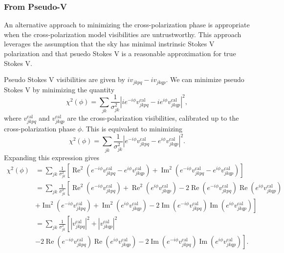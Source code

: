 \documentclass{article}
\newcommand\re{\operatorname{Re}}
\newcommand\im{\operatorname{Im}}
\begin{document}
\subsubsection{From Pseudo-V}

An alternative approach to minimizing the cross-polarization phase is appropriate when the cross-polarization model visibilities are untrustworthy. This approach leverages the assumption that the sky has minimal instrinsic Stokes V polarization and that psuedo Stokes V is a reasonable approximation for true Stokes V.

Pseudo Stokes V visibilities are given by $i v_{jkpq} - i v_{jkqp}$. We can minimize pseudo Stokes V by minimizing the quantity
\begin{equation}
    \chi^2(\phi) = \sum_{jk} \frac{1}{\sigma^2_{jk}} \left| i e^{-i \phi} v^\text{cal}_{jkpq} - i e^{i \phi} v^\text{cal}_{jkqp} \right|^2,
\end{equation}
where $v^\text{cal}_{jkpq}$ and $v^\text{cal}_{jkqp}$ are the cross-polarization visibilities, calibrated up to the cross-polarization phase $\phi$. This is equivalent to minimizing
\begin{equation}
    \chi^2(\phi) = \sum_{jk} \frac{1}{\sigma^2_{jk}} \left| e^{-i \phi} v^\text{cal}_{jkpq} - e^{i \phi} v^\text{cal}_{jkqp} \right|^2.
\end{equation}
Expanding this expression gives
\begin{equation}
\begin{split}
    \chi^2(\phi) &= \sum_{jk} \frac{1}{\sigma^2_{jk}} \left[ \re^2\left( e^{-i \phi} v^\text{cal}_{jkpq} - e^{i \phi} v^\text{cal}_{jkqp}\right) + \im^2\left( e^{-i \phi} v^\text{cal}_{jkpq} - e^{i \phi} v^\text{cal}_{jkqp}\right) \right] \\
    &= \sum_{jk} \frac{1}{\sigma^2_{jk}} \left[ \re^2\left( e^{-i \phi} v^\text{cal}_{jkpq} \right) + \re^2 
    \left( e^{i \phi} v^\text{cal}_{jkqp} \right) - 2 \re \left( e^{-i \phi} v^\text{cal}_{jkpq} \right) \re
    \left( e^{i \phi} v^\text{cal}_{jkqp} \right) \right.  \\
    &\left. + \im^2\left( e^{-i \phi} v^\text{cal}_{jkpq} \right) + \im^2 
    \left( e^{i \phi} v^\text{cal}_{jkqp} \right) - 2 \im \left( e^{-i \phi} v^\text{cal}_{jkpq} \right) \im
    \left( e^{i \phi} v^\text{cal}_{jkqp} \right) \right] \\
    &= \sum_{jk} \frac{1}{\sigma^2_{jk}} \left[ \left| v^\text{cal}_{jkpq} \right|^2 + \left| v^\text{cal}_{jkqp} \right|^2  \right. \\ 
    & \left. - 2 \re \left( e^{-i \phi} v^\text{cal}_{jkpq} \right) \re
    \left( e^{i \phi} v^\text{cal}_{jkqp} \right) - 2 \im \left( e^{-i \phi} v^\text{cal}_{jkpq} \right) \im
    \left( e^{i \phi} v^\text{cal}_{jkqp} \right) \right].
\end{split}
\end{equation}
\end{document}

